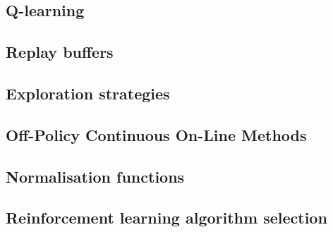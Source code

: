 \subsection{Q-learning}
\label{sec:Q_learning}


\subsection{Replay buffers}
\label{sec:buffers}


\subsection{Exploration strategies}
\label{sec:exploration}


\subsection{Off-Policy Continuous On-Line Methods}
\label{sec:off_policy}


\subsection{Normalisation functions}
\label{sec:normalisation_functions}


\subsection{Reinforcement learning algorithm selection}
\label{sec:RL_algo_selection}
